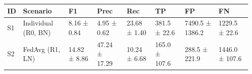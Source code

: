 \begin{tabular}{llllllll}
\toprule
ID & Scenario & F1 & Prec & Rec & TP & FP & FN \\
\midrule
S1 & Individual (R0, BN) & 8.16 ± 0.84 & 4.95 ± 0.62 & 23.68 ± 1.40 & 381.5 ± 22.6 & 7490.5 ± 1386.2 & 1229.5 ± 22.6 \\
S2 & FedAvg (R1, LN) & 14.82 ± 8.86 & 47.24 ± 17.29 & 10.24 ± 6.68 & 165.0 ± 107.6 & 288.5 ± 221.9 & 1446.0 ± 107.6 \\
\bottomrule
\end{tabular}
